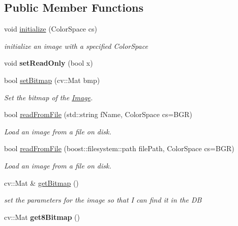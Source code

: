 \subsection*{Public Member Functions}
\begin{DoxyCompactItemize}
\item 
void \hyperlink{classImage_ab5a21f84f8a2acda7a63567f1078e35c}{initialize} (Color\+Space cs)
\begin{DoxyCompactList}\small\item\em initialize an image with a specified Color\+Space \end{DoxyCompactList}\item 
void {\bfseries set\+Read\+Only} (bool x)\hypertarget{classImage_a091620a35574d2c404ae6a8946dae33e}{}\label{classImage_a091620a35574d2c404ae6a8946dae33e}

\item 
bool \hyperlink{classImage_a87e5728d527b4e28f8696a4f266f07e7}{set\+Bitmap} (cv\+::\+Mat bmp)
\begin{DoxyCompactList}\small\item\em Set the bitmap of the \hyperlink{classImage}{Image}. \end{DoxyCompactList}\item 
bool \hyperlink{classImage_ac0cc82352caee90c6faa9401663e16fd}{read\+From\+File} (std\+::string f\+Name, Color\+Space cs=B\+GR)
\begin{DoxyCompactList}\small\item\em Load an image from a file on disk. \end{DoxyCompactList}\item 
bool \hyperlink{classImage_aa2f3974b50f53aecfca04077b5ccadf6}{read\+From\+File} (boost\+::filesystem\+::path file\+Path, Color\+Space cs=B\+GR)
\begin{DoxyCompactList}\small\item\em Load an image from a file on disk. \end{DoxyCompactList}\item 
cv\+::\+Mat \& \hyperlink{classImage_a75c5976f165be3d79b745d3d0a297662}{get\+Bitmap} ()
\begin{DoxyCompactList}\small\item\em set the parameters for the image so that I can find it in the DB \end{DoxyCompactList}\item 
cv\+::\+Mat {\bfseries get8\+Bitmap} ()\hypertarget{classImage_a4a6e8b26ab1004190896faf55f0f7616}{}\label{classImage_a4a6e8b26ab1004190896faf55f0f7616}


\end{DoxyCompactItemize}
